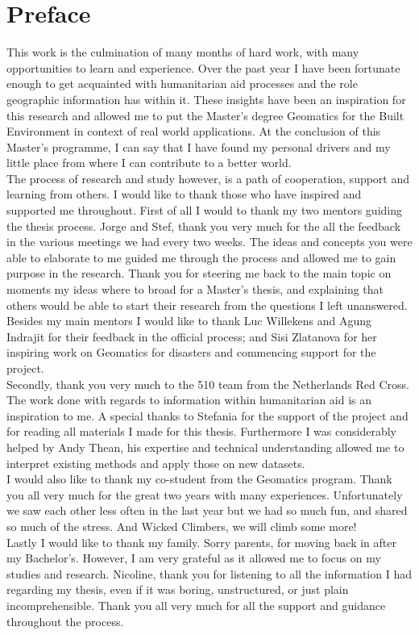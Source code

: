 \chapter*{Preface}
This work is the culmination of many months of hard work, with many opportunities to learn and experience. Over the past year I have been fortunate enough to get acquainted with humanitarian aid processes and the role geographic information has within it. These insights have been an inspiration for this research and allowed me to put the Master's degree Geomatics for the Built Environment in context of real world applications. At the conclusion of this Master's programme, I can say that I have found my personal drivers and my little place from where I can contribute to a better world. \\

\noindent The process of research and study however, is a path of cooperation, support and learning from others. I would like to thank those who have inspired and supported me throughout. First of all I would to thank my two mentors guiding the thesis process. Jorge and Stef, thank you very much for the all the feedback in the various meetings we had every two weeks. The ideas and concepts you were able to elaborate to me guided me through the process and allowed me to gain purpose in the research. Thank you for steering me back to the main topic on moments my ideas where to broad for a Master's thesis, and explaining that others would be able to start their research from the questions I left unanswered. Besides my main mentors I would like to thank Luc Willekens and Agung Indrajit for their feedback in the official process; and Sisi Zlatanova for her inspiring work on Geomatics for disasters and commencing support for the project.\\

\noindent Secondly, thank you very much to the 510 team from the Netherlands Red Cross. The work done with regards to information within humanitarian aid is an inspiration to me. A special thanks to Stefania for the support of the project and for reading all materials I made for this thesis. Furthermore I was considerably helped by Andy Thean, his expertise and technical understanding allowed me to interpret existing methods and apply those on new datasets.\\

\noindent I would also like to thank my co-student from the Geomatics program. Thank you all very much for the great two years with many experiences. Unfortunately we saw each other less often in the last year but we had so much fun, and shared so much of the stress. And Wicked Climbers, we will climb some more!\\

\noindent Lastly I would like to thank my family. Sorry parents, for moving back in after my Bachelor's. However, I am very grateful as it allowed me to focus on my studies and research. Nicoline, thank you for listening to all the information I had regarding my thesis, even if it was boring, unstructured, or just plain incomprehensible. Thank you all very much for all the support and guidance throughout the process. 